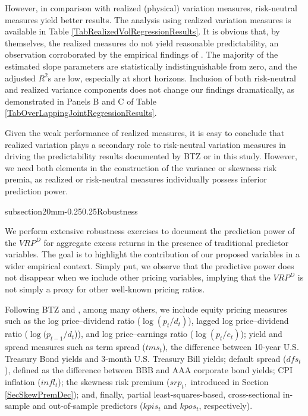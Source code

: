 \documentclass[11pt]{article}
\makeatletter
\renewcommand\subsection{\@startsection%
    {subsection}{2}{0mm}{-0.25\baselineskip}{0.25\baselineskip}{\bfseries\large}}
\makeatother
\begin{document}
However, in comparison with realized (physical) variation measures, risk-neutral measures yield better results. The analysis using realized variation measures is available in Table \ref{TabRealizedVolRegressionResults}. It is obvious that, by themselves, the realized measures do not yield reasonable predictability, an observation corroborated by the empirical findings of \cite{BekaertEngstromErmolov14JEc}.  The majority of the estimated slope parameters are statistically indistinguishable from zero, and the adjusted $R^2$s are low, especially at short horizons. Inclusion of both risk-neutral and realized variance components does not change our findings dramatically, as demonstrated in Panels B and C of Table \ref{TabOverLappingJointRegressionResults}.

Given the weak performance of realized measures, it is easy to conclude that realized variation plays a secondary role to risk-neutral variation measures in driving the predictability results documented by BTZ or in this study. However, we need both elements in the construction of the variance or skewness risk premia, as realized or risk-neutral  measures individually possess inferior prediction power.

\subsection{Robustness} \label{SecRobustness}

We perform extensive robustness exercises to document the prediction power of the $VRP^D$ for aggregate excess returns in the presence of traditional predictor variables. The goal is to highlight the contribution of our proposed variables in a wider empirical context. Simply put, we observe that the predictive power does not disappear when we include other pricing variables, implying that the $VRP^D$ is not simply a proxy for other well-known pricing ratios.

Following BTZ and \cite{FFTT14RoF}, among many others, we include equity pricing measures such as the log price--dividend ratio ($\log(p_t/d_t)$), lagged log price--dividend ratio ($\log(p_{t-1}/d_t$)), and log price--earnings ratio ($\log(p_t/e_t)$); yield and spread measures such as term spread ($tms_t$), the difference between 10-year U.S. Treasury Bond yields and 3-month U.S. Treasury Bill yields; default spread ($dfs_t$), defined as the difference between BBB and AAA corporate bond yields; CPI inflation ($infl_t$); the skewness risk premium ($srp_t,$ introduced in Section \ref{SecSkewPremDec}); and, finally, \cite{KellyPruit13JF} partial least-squares-based, cross-sectional in-sample and out-of-sample predictors ($kpis_t$ and $kpos_t$, respectively).
\end{document}
